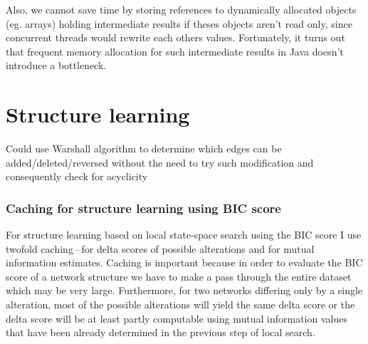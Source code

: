 \documentclass[english,cover]{fitthesis} %
\newcommand{\todo}[1]{{\color{red}#1}}
\begin{document}
Also, we cannot save time by storing references to dynamically allocated objects (eg. arrays) holding intermediate results if theses objects aren't read only, since concurrent threads would rewrite each others values. Fortunately, it turns out that frequent memory allocation for such intermediate results in Java doesn't introduce a bottleneck.







\section{Structure learning}
\todo{Could use Warshall algorithm to determine which edges can be added/deleted/reversed without the need to try such modification and consequently check for acyclicity}

\subsubsection{Caching for structure learning using BIC score}
For structure learning based on local state-space search using the BIC score I use twofold caching\,--\,for delta scores of possible alterations and for mutual information estimates. Caching is important because in order to evaluate the BIC score of a network structure we have to make a pass through the entire dataset which may be very large. Furthermore, for two networks differing only by a single alteration, most of the possible alterations will yield the same delta score or the delta score will be at least partly computable using mutual information values that have been already determined in the previous step of local search.
\end{document}
